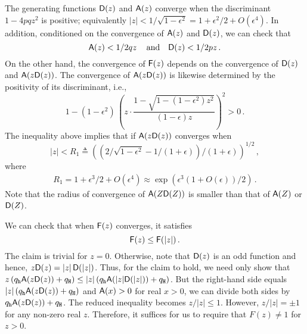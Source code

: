   The generating functions $\mathsf{D}(z)$ and $\mathsf{A}(z)$ converge when
  the discriminant $1 - 4pqz^2$ is positive; equivalently
  $|z| < 1/\sqrt{1 - \epsilon^2}
  = 1 + \epsilon^2/2 + O(\epsilon^4)$. 
  In addition, conditioned on the convergence of $\mathsf{A}(z)$ and $\mathsf{D}(z)$, 
  we can check that 
  \begin{equation}\label{eq:conv-value-A-and-D}
    \mathsf{A}(z) < 1/2qz\, \quad \text{and}\quad \mathsf{D}(z) < 1/2pz
    \,.
  \end{equation}
  On the other hand, the convergence of $\mathsf{F}(z)$ 
  depends on the convergence of $\mathsf{D}(z)$ and $\mathsf{A}(z \mathsf{D}(z))$. 
  The convergence of $\mathsf{A}(z \mathsf{D}(z))$ is likewise determined by the 
  positivity of its discriminant, i.e.,
  $$
    1 - (1 - \epsilon^2)\, \left(z \cdot \frac{1 - \sqrt{1 - (1 - \epsilon^2) z^2}}{(1 - \epsilon) z}\right)^2  > 0
    \,.
  $$
  The inequality above implies that 
  if $\mathsf{A}(z \mathsf{D}(z))$ converges when 
  $$
    |z| 
    < R_1 
    \triangleq \left(\left(2/\sqrt{1 - \epsilon^2} - 1/(1+\epsilon)\right)/(1 + \epsilon)\right)^{1/2} 
    \,,
  $$ where 
  \begin{align}\label{eq:roc-AZDZ}
    R_1 = 1 + \epsilon^3/2 + O(\epsilon^4) 
    \approx \exp\left(\epsilon^3 (1 + O(\epsilon))/2 \right)
    \,.
  \end{align}
  \noindent
  Note that the radius of convergence of $\mathsf{A}(Z \mathsf{D}(Z))$ 
  is smaller than that of $\mathsf{A}(Z)$ or $\mathsf{D}(Z)$.

  We can check that when $\mathsf{F}(z)$ converges, 
  it satisfies $$\mathsf{F}(z) \leq \mathsf{F}(|z|)\,.$$ 
  The claim is trivial for $z = 0$. 
  Otherwise,
  note that $\mathsf{D}(z)$ is an odd function and hence, 
  $z \mathsf{D}(z) = |z|\, \mathsf{D}(|z|)$. 
  Thus, for the claim to hold, we need only show that 
  $
    z\,(q_{\mathtt{h}} \mathsf{A}(z\mathsf{D}(z)) + q_{\mathtt{H}}) 
    \leq |z|\,(q_{\mathtt{h}} \mathsf{A}(|z|\mathsf{D}(|z|)) + q_{\mathtt{H}}) 
  $. 
  But the right-hand side equals $|z|\,(q_{\mathtt{h}} \mathsf{A}(z\mathsf{D}(z)) + q_{\mathtt{H}})$ 
  and $\mathsf{A}(x) > 0$ for real $x > 0$, 
  we can divide both sides by $q_{\mathtt{h}} \mathsf{A}(z\mathsf{D}(z)) + q_{\mathtt{H}}$. 
  The reduced inequality becomes 
  $z/|z| \leq 1$. 
  However, $z/|z| = \pm 1$ for any non-zero real $z$.
  Therefore, it suffices for us to require that $F(z) \neq 1$ for $z > 0$. 
  
